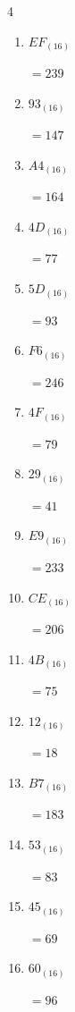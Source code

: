 \begin{multicols}{4}
\begin{enumerate}
        $=118$

  \item $EF_{(16)}$

        $=239$

  \item $93_{(16)}$

        $=147$

  \item $A4_{(16)}$

        $=164$

  \item $4D_{(16)}$

        $=77$

  \item $5D_{(16)}$

        $=93$

  \item $F6_{(16)}$

        $=246$

  \item $4F_{(16)}$

        $=79$

  \item $29_{(16)}$

        $=41$

  \item $E9_{(16)}$

        $=233$

\columnbreak %

  \item $CE_{(16)}$

        $=206$

  \item $4B_{(16)}$

        $=75$

  \item $12_{(16)}$

        $=18$

  \item $B7_{(16)}$

        $=183$

  \item $53_{(16)}$

        $=83$

  \item $45_{(16)}$

        $=69$

  \item $60_{(16)}$

        $=96$


\end{enumerate}
\end{multicols}
